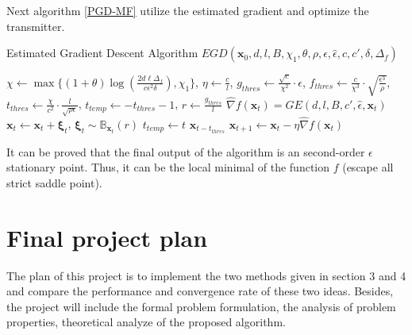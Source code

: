 \documentclass[12pt,a4paper]{article}
\begin{document}
	\par Next algorithm \ref{PGD-MF} utilize the estimated gradient and optimize the transmitter.
	\begin{algorithm}[h]
		\label{PGD-MF}
		\caption{Estimated Gradient Descent Algorithm $EGD(\bm{x}_0,d,l,B,\chi_1,\theta,\rho,\epsilon,\hat{\epsilon},c,c',\delta,\Delta_f)$}
		\begin{algorithmic}[1]
			\State $\chi \leftarrow \max\{(1+\theta)\log(\frac{2d\ell\Delta_f}{c\epsilon^2\delta}), \chi_1\}$, $\eta\leftarrow\frac{c}{l}$, $g_{thres}\leftarrow\frac{\sqrt{c}}{\chi^2}\cdot\epsilon$, $f_{thres}\leftarrow\frac{c}{\chi^3}\cdot\sqrt{\frac{\epsilon^3}{\rho}}$, $t_{thres}\leftarrow\frac{\chi}{c^2}\cdot\frac{l}{\sqrt{\rho\epsilon}}$, $t_{temp}\leftarrow-t_{thres}-1$, $r\leftarrow \frac{g_{thres}}{l}$
			\State $\hat{\nabla}f(\bm{x}_t)=GE(d,l,B,c',\hat{\epsilon},\bm{x}_t)$
			\State $\bm{x}_t\leftarrow\bm{x}_t+\bm{\xi}_t$, $\bm{\xi}_t\sim\mathbb{B}_{\bm{x}_t}(r)$
			\State $t_{temp}\leftarrow t$
			\EndIf
			\State \Return $\bm{x}_{t-t_{thres}}$
			\EndIf
			\State $\bm{x}_{t+1}\leftarrow\bm{x}_t-\eta\hat{\nabla}f(\bm{x}_t)$
			\EndFor
		\end{algorithmic}
	\end{algorithm}
	\par It can be proved that the final output of the algorithm is an second-order $\epsilon$ stationary point. Thus, it can be the local minimal of the function $f$ (escape all strict saddle point). 
	\section{Final project plan}
	\noindent
	\par The plan of this project is to implement the two methods given in section 3 and 4 and compare the performance and convergence rate of these two ideas. Besides, the project will include the formal problem formulation, the analysis of problem properties, theoretical analyze of the proposed algorithm.
	

\end{document}
